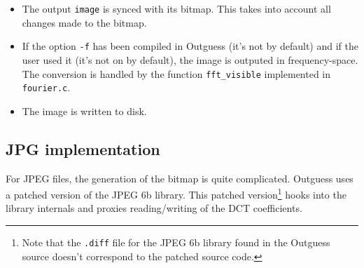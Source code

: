 \documentclass{article}
\begin{document}
\begin{itemize}
		The value returned by \texttt{preserve} in this case corresponds to the index of the bit that was changed to preserve the statistics, if any. If no bit was changed, a negative or null value is returned \footnote{If the modified offset was $0$, it wouldn't be counted in the foiling statistics. This is a bug.}. The \texttt{steg\_offset} array is only used to display the mean/standard deviation of the distance of changed bits to foil statistics \footnote{The final call to \texttt{preserve} will also try to modify some bits to preserve the distribution of DCT coefficients that failed to be preserved in previous calls. But these final modifications don't be taken into account in the displayed statistics. This is a bug.}.

		Finally, the statistical foiling logic is notified that the image finished being processed by calling the \texttt{preserve} function passing an offset greater or equal to the number of bits:
		\begin{verbatim}
      /* Indicates that we are done with the image */
      bitmap.preserve(&bitmap, bitmap.bits);
		\end{verbatim}
	
		During this entire process, the global variables are used to count the numbers of successful foils (\texttt{steg\_foil}) and unsucessful foils (\texttt{steg\_foilfail}). These variables are modified in handler-specific code. They are only used for informational purpose.
	
	\item The output \texttt{image} is synced with its bitmap. This takes into account all changes made to the bitmap.
	
	\item If the option \texttt{-f} has been compiled in Outguess (it's not by default) and if the user used it (it's not on by default), the image is outputed in frequency-space. The conversion is handled by the function \texttt{fft\_visible} implemented in \texttt{fourier.c}.
	
	\item The image is written to disk.
	
		
\end{itemize}

\subsection{JPG implementation}

For JPEG files, the generation of the bitmap is quite complicated. Outguess uses a patched version of the JPEG 6b library. This patched version\footnote{Note that the \texttt{.diff} file for the JPEG 6b library found in the Outguess source doesn't correspond to the patched source code.} hooks into the library internals and proxies reading/writing of the DCT coefficients.
\end{document}

